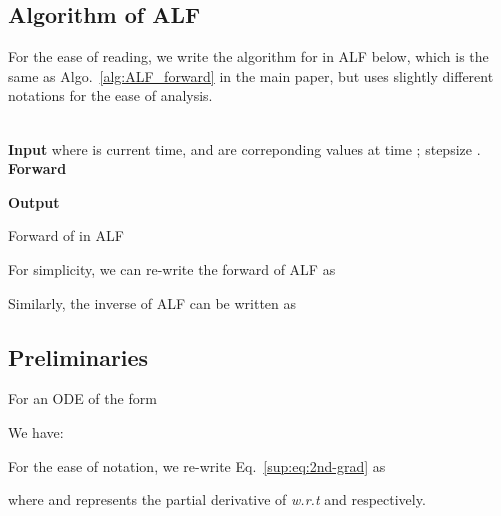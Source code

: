\documentclass{article} \usepackage{iclr2021_conference,times}
\begin{document}
\subsection{Algorithm of ALF}
\label{sub:sec:ALF}
For the ease of reading, we write the algorithm for  in ALF below, which is the same as Algo.~\ref{alg:ALF_forward} in the main paper, but uses slightly different notations for the ease of analysis.
\begin{algorithm}
 \\
\textbf{Input}  where  is current time,  and  are correponding values at time ; stepsize .\\
\textbf{Forward} 

\textbf{Output} \hspace{28mm} 
\caption{Forward of  in ALF}
\label{sup:alg:ALF_forward2}
\end{algorithm}

For simplicity, we can re-write the forward of ALF as

Similarly, the inverse of ALF can be written as

\subsection{Preliminaries}
For an ODE of the form

We have:

For the ease of notation, we re-write Eq.~\ref{sup:eq:2nd-grad} as

where  and  represents the partial derivative of  \textit{w.r.t}  and  respectively.
\end{document}
